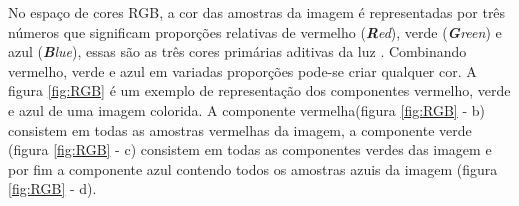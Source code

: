 No espaço de cores RGB, a cor das amostras da imagem é representadas por três números que significam proporções relativas de vermelho (\textit{\textbf{R}ed}), verde (\textit{\textbf{G}reen}) e azul (\textit{\textbf{B}lue}), essas são as três cores primárias aditivas da luz \cite{richardson2011h}.	Combinando vermelho, verde e azul em variadas proporções pode-se criar qualquer cor. A figura \ref{fig:RGB} é um exemplo de representação dos componentes vermelho, verde e azul de uma imagem colorida. A componente vermelha(figura \ref{fig:RGB} - b) consistem em todas as amostras vermelhas da imagem, a componente verde (figura \ref{fig:RGB} - c) consistem em todas as componentes verdes das imagem e por fim a componente azul contendo todos os amostras azuis da imagem (figura \ref{fig:RGB} - d).

\begin{figure}
    \centering
    \qquad
	\qquad
\end{figure}
